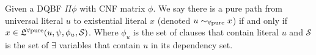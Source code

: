\documentclass[runningheads]{llncs}
\newcommand{\pusim}{\ensuremath{\sim_{\mbox{\scriptsize \upshape $\forall$pure}}}}
\newcommand{\pathc}[1]{\ensuremath{\mathfrak{C}^{\mbox{\scriptsize \upshape #1}}}\xspace}
\newcommand{\pathl}[1]{\ensuremath{\mathfrak{L}^{\mbox{\scriptsize \upshape #1}}}\xspace}
\newcommand{\pathcpu}{\pathc{$\forall$pure}}
\newcommand{\pathlpu}{\pathl{$\forall$pure}}
\begin{document}
	
	\begin{definition}
		\label{def:upure-connection}
		Given a DQBF $\Pi\phi$ with CNF matrix $\phi$.
		We say there is a pure path from universal literal $u$ to existential literal $x$ (denoted $u\pusim x$) if and only if $x\in \pathlpu (u,\psi, \phi_u, \mathcal{S})$.
		Where $\phi_u$ is the set of clauses that contain literal $u$ and  $\mathcal{S}$ is the set of $\exists$ variables that contain $u$ in its dependency set. 
	\end{definition}
	
\end{document}

